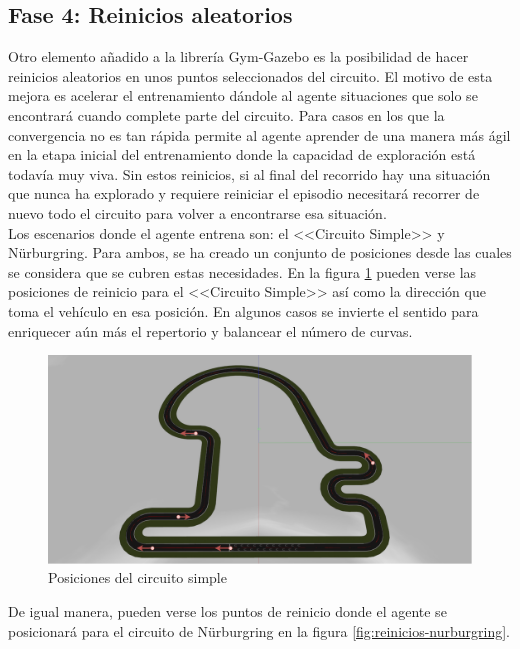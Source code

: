 \vspace{5mm}

\subsection{Fase 4: Reinicios aleatorios}

Otro elemento añadido a la librería Gym-Gazebo es la posibilidad de hacer reinicios aleatorios en unos puntos seleccionados del circuito. El motivo de esta mejora es acelerar el entrenamiento dándole al agente situaciones que solo se encontrará cuando complete parte del circuito. Para casos en los que la convergencia no es tan rápida permite al agente aprender de una manera más ágil en la etapa inicial del entrenamiento donde la capacidad de exploración está todavía muy viva. Sin estos reinicios, si al final del recorrido hay una situación que nunca ha explorado y requiere reiniciar el episodio necesitará recorrer de nuevo todo el circuito para volver a encontrarse esa situación.\\

Los escenarios donde el agente entrena son: el <<Circuito Simple>> y Nürburgring. Para ambos, se ha creado un conjunto de posiciones desde las cuales se considera que se cubren estas necesidades. En la figura \ref{fig:reinicios-simple} pueden verse las posiciones de reinicio para el <<Circuito Simple>> así como la dirección que toma el vehículo en esa posición. En algunos casos se invierte el sentido para enriquecer aún más el repertorio y balancear el número de curvas.

\begin{figure}[!ht]
    \centering \includegraphics[width=0.8\columnwidth]{./figures/chapter_4/circuito_simple_reinicios.png}
    \caption{Posiciones del circuito simple}\label{fig:reinicios-simple}
\end{figure}

De igual manera, pueden verse los puntos de reinicio donde el agente se posicionará para el circuito de Nürburgring en la figura \ref{fig:reinicios-nurburgring}.


